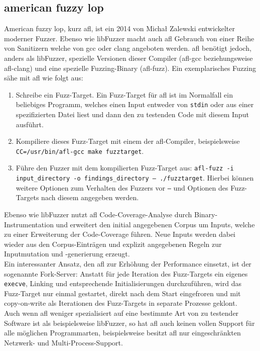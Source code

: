 \documentclass[a4paper]{article}
\begin{document}
\subsection{american fuzzy lop}
American fuzzy lop\cite{afl}, kurz afl, ist ein 2014 von Michał Zalewski entwickelter moderner Fuzzer. 
Ebenso wie libFuzzer macht auch afl Gebrauch von einer Reihe von Sanitizern welche von gcc oder clang angeboten werden. 
afl benötigt jedoch, anders als libFuzzer, spezielle Versionen dieser Compiler (afl-gcc beziehungsweise afl-clang) und eine spezielle Fuzzing-Binary (afl-fuzz).
Ein exemplarisches Fuzzing sähe mit afl wie folgt aus:
\begin{enumerate}
    \item Schreibe ein Fuzz-Target. Ein Fuzz-Target für afl ist im Normalfall ein beliebiges Programm, welches einen Input entweder von \texttt{stdin} oder aus einer spezifizierten Datei liest und dann den zu testenden Code mit diesem Input ausführt.
    \item Kompiliere dieses Fuzz-Target mit einem der afl-Compiler, beispielsweise \texttt{CC=/usr/bin/afl-gcc make fuzztarget}.
    \item Führe den Fuzzer mit dem kompilierten Fuzz-Target aus: \texttt{afl-fuzz -i input\_directory -o findings\_directory -- ./fuzztarget}. Hierbei können weitere Optionen zum Verhalten des Fuzzers vor \texttt{--} und Optionen des Fuzz-Targets nach diesem angegeben werden.
\end{enumerate}
Ebenso wie libFuzzer nutzt afl Code-Coverage-Analyse durch Binary-Instrumentation und erweitert den initial angegebenen Corpus um Inputs, welche zu einer Erweiterung der Code-Coverage führen. 
Neue Inputs werden dabei wieder aus den Corpus-Einträgen und explizit angegebenen Regeln zur Inputmutation und -generierung erzeugt.\\
Ein interessanter Ansatz, den afl zur Erhöhung der Performance einsetzt, ist der sogenannte Fork-Server\cite{afl}: Anstatt für jede Iteration des Fuzz-Targets ein eigenes \texttt{execve}, Linking und entsprechende Initialisierungen durchzuführen, wird das Fuzz-Target nur einmal gestartet, direkt nach dem Start eingefroren und mit copy-on-write als Iterationen des Fuzz-Targets in separate Prozesse geklont.\\
Auch wenn afl weniger spezialisiert auf eine bestimmte Art von zu testender Software ist als beispielsweise libFuzzer, so hat afl auch keinen vollen Support für alle möglichen Programmarten, beispielsweise besitzt afl nur eingeschränkten Netzwerk- und Multi-Process-Support.
\end{document}
